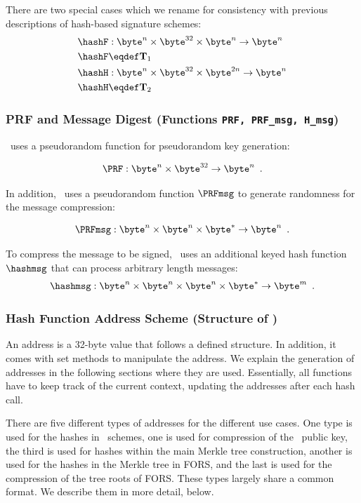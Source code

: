 There are two special cases which we rename for consistency with previous descriptions of hash-based signature schemes:
\begin{align*}
    \hashF& : \byte^{n}\times \byte^{32}\times \byte^{n}\rightarrow \byte^{n} \\
    \hashF& \eqdef \mathbf{T}_1\\
    \hashH& : \byte^{n}\times \byte^{32}\times \byte^{2n}\rightarrow \byte^{n} \\
    \hashH& \eqdef \mathbf{T}_2
\end{align*}

\subsubsection{PRF and Message Digest (Functions \texttt{PRF, PRF\_msg, H\_msg})}

\SPHINCSA\ uses a pseudorandom function \PRF for pseudorandom key generation:

\[\PRF : \byte^{n}\times \byte^{32}\rightarrow \byte^{n} \enspace.\]

In addition, \SPHINCSA\ uses a pseudorandom function $\PRFmsg$ to generate randomness for the message compression:

\[\PRFmsg : \byte^{n}\times \byte^{n}\times \byte^{*}\rightarrow \byte^{n} \enspace.\]

To compress the message to be signed, \SPHINCSA\ uses an additional keyed hash function $\hashmsg$ that can process arbitrary length messages:
\[ \hashmsg : \byte^{n}\times \byte^{n}\times \byte^{n}\times \byte^{*}\rightarrow \byte^{m} \enspace.\]

\subsubsection{Hash Function Address Scheme (Structure of {\ADRS})} \label{sec:addr}

An address \ADRS is a 32-byte value that follows a defined structure. In addition, it comes with set methods to manipulate the address. We explain the generation of addresses in the following sections where they are used. Essentially, all functions have to keep track of the current context, updating the addresses after each hash call.

There are five different types of addresses for the different use cases. One type is used for the hashes in \WOTSCS\ schemes, one is used for compression of the \WOTSCS\ public key, the third is used for hashes within the main Merkle tree construction, another is used for the hashes in the Merkle tree in FORS, and the last is used for the compression of the tree roots of FORS. These types largely share a common format. We describe them in more detail, below.

